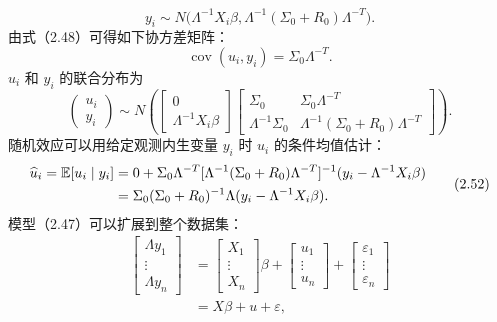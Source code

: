 \begin{equation}
y_i\sim N\bigl(\Lambda^{-1}X_i\beta,
\Lambda^{-1}(\Sigma_0+R_0)\Lambda^{-T}\bigr).
\tag{2.49}
\end{equation}
由式（2.48）可得如下协方差矩阵：
\begin{equation}
\operatorname{cov}(u_i,y_i)=\Sigma_0\Lambda^{-T}.
\tag{2.50}
\end{equation}
$u_i$ 和 $y_i$ 的联合分布为
\begin{equation}
\begin{pmatrix}u_i\\y_i\end{pmatrix}
\sim N\left(
\begin{bmatrix}0\\\Lambda^{-1}X_i\beta\end{bmatrix}
\begin{bmatrix}
\Sigma_0&\Sigma_0\Lambda^{-T}\\
\Lambda^{-1}\Sigma_0&\Lambda^{-1}(\Sigma_0+R_0)\Lambda^{-T}
\end{bmatrix}\right).
\tag{2.51}
\end{equation}
随机效应可以用给定观测内生变量 $y_i$ 时 $u_i$ 的条件均值估计：
\begin{equation}
\begin{aligned}
\widehat u_i=\mathbb{E}[u_i\mid y_i]
 &=0+\Sigma_0\Lambda^{-T}
 [\Lambda^{-1}(\Sigma_0+R_0)\Lambda^{-T}]^{-1}
 (y_i-\Lambda^{-1}X_i\beta)\\
 &=\Sigma_0(\Sigma_0+R_0)^{-1}\Lambda
 (y_i-\Lambda^{-1}X_i\beta).
\end{aligned}\tag{2.52}
\end{equation}
模型（2.47）可以扩展到整个数据集：
\begin{equation}
\begin{aligned}
\begin{bmatrix}\Lambda y_1\\\vdots\\\Lambda y_n\end{bmatrix}
&=\begin{bmatrix}X_1\\\vdots\\X_n\end{bmatrix}\beta
+\begin{bmatrix}u_1\\\vdots\\u_n\end{bmatrix}
+\begin{bmatrix}\varepsilon_1\\\vdots\\\varepsilon_n\end{bmatrix}\\
&=X\beta+u+\varepsilon,
\end{aligned}\tag{2.53}
\end{equation}
